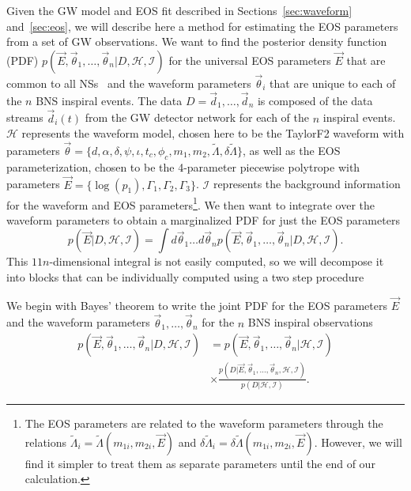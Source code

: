 \documentclass[twocolumn,prd,amssymb,aps,nofootinbib,showpacs,epsf]{revtex4}
\begin{document}
Given the GW model and EOS fit described in Sections~\ref{sec:waveform} and~\ref{sec:eos}, we will describe here a method for estimating the EOS parameters from a set of GW observations. We want to find the posterior density function (PDF) $p(\vec E,\vec\theta_1,\dots,\vec\theta_n | D,\mathcal{H},\mathcal{I})$ for the universal EOS parameters $\vec E$ that are common to all NSs~\cite{Glendenning1996book} and the waveform parameters $\vec\theta_i$ that are unique to each of the $n$ BNS inspiral events. The data $D = \vec d_1,\dots, \vec d_n$ is composed of the data streams $\vec d_i(t)$ from the GW detector network for each of the $n$ inspiral events. $\mathcal{H}$ represents the waveform model, chosen here to be the TaylorF2 waveform with parameters $\vec\theta = \{d, \alpha, \delta, \psi, \iota, t_c, \phi_c, m_1, m_2, \tilde\Lambda, \delta\tilde\Lambda\}$, as well as the EOS parameterization, chosen to be the 4-parameter piecewise polytrope with parameters $\vec E = \{\log(p_1), \Gamma_1, \Gamma_2, \Gamma_3\}$. $\mathcal{I}$ represents the background information for the waveform and EOS parameters\footnote{The EOS parameters are related to the waveform parameters through the relations $\tilde\Lambda_i = \tilde\Lambda(m_{1i}, m_{2i}, \vec E)$ and $\delta\tilde\Lambda_i = \delta\tilde\Lambda(m_{1i}, m_{2i}, \vec E)$. However, we will find it simpler to treat them as separate parameters until the end of our calculation.}. We then want to integrate over the waveform parameters to obtain a marginalized PDF for just the EOS parameters
\begin{equation}
\label{eq:margEOS}
p(\vec E | D,\mathcal{H},\mathcal{I}) = \int d\vec\theta_1 \dots d\vec\theta_n p(\vec E,\vec\theta_1,\dots,\vec\theta_n | D,\mathcal{H},\mathcal{I}).
\end{equation}
This $11n$-dimensional integral is not easily computed, so we will decompose it into blocks that can be individually computed using a two step procedure
  

We begin with Bayes' theorem to write the joint PDF for the EOS parameters $\vec E$ and the waveform parameters $\vec\theta_1,\dots,\vec\theta_n$ for the $n$ BNS inspiral observations
\begin{equation}
\begin{split}
p(\vec E,\vec\theta_1,\dots,\vec\theta_n | D,\mathcal{H},\mathcal{I})
&= p(\vec E,\vec\theta_1,\dots,\vec\theta_n | \mathcal{H},\mathcal{I}) \\
& \times\frac{ p(D | \vec E,\vec\theta_1,\dots,\vec\theta_n,\mathcal{H},\mathcal{I}) }{ p(D | \mathcal{H},\mathcal{I}) }.
\end{split}
\end{equation}
\end{document}

